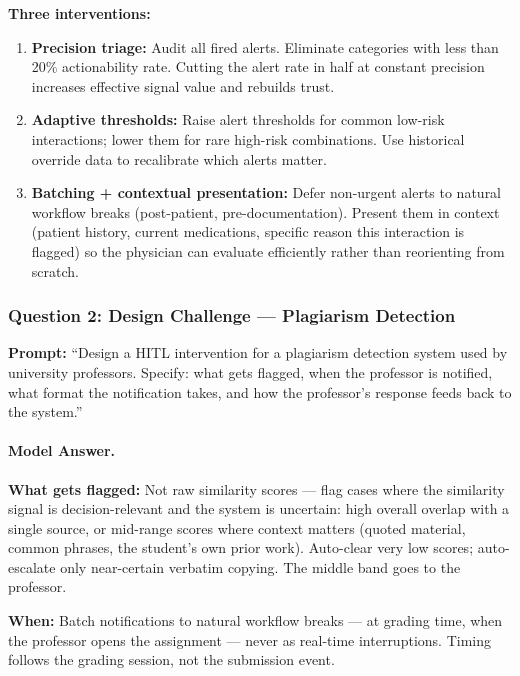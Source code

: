 \textbf{Three interventions:}

\begin{enumerate}
    \item \textbf{Precision triage:} Audit all fired alerts. Eliminate categories with less than 20\% actionability rate. Cutting the alert rate in half at constant precision increases effective signal value and rebuilds trust.

    \item \textbf{Adaptive thresholds:} Raise alert thresholds for common low-risk interactions; lower them for rare high-risk combinations. Use historical override data to recalibrate which alerts matter.

    \item \textbf{Batching + contextual presentation:} Defer non-urgent alerts to natural workflow breaks (post-patient, pre-documentation). Present them in context (patient history, current medications, specific reason this interaction is flagged) so the physician can evaluate efficiently rather than reorienting from scratch.
\end{enumerate}

\subsubsection{Question 2: Design Challenge --- Plagiarism Detection}

\textbf{Prompt:} ``Design a HITL intervention for a plagiarism detection system used by university professors. Specify: what gets flagged, when the professor is notified, what format the notification takes, and how the professor's response feeds back to the system.''

\paragraph{Model Answer.}

\textbf{What gets flagged:} Not raw similarity scores --- flag cases where the similarity signal is decision-relevant and the system is uncertain: high overall overlap with a single source, or mid-range scores where context matters (quoted material, common phrases, the student's own prior work). Auto-clear very low scores; auto-escalate only near-certain verbatim copying. The middle band goes to the professor.

\textbf{When:} Batch notifications to natural workflow breaks --- at grading time, when the professor opens the assignment --- never as real-time interruptions. Timing follows the grading session, not the submission event.

